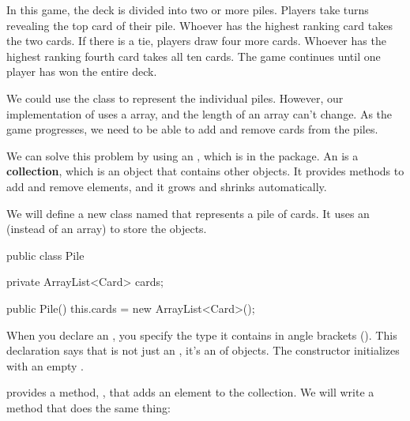 In this game, the deck is divided into two or more piles.
Players take turns revealing the top card of their pile.
Whoever has the highest ranking card takes the two cards.
If there is a tie, players draw four more cards.
Whoever has the highest ranking fourth card takes all ten cards.
The game continues until one player has won the entire deck.

We could use the  class to represent the individual piles.
However, our implementation of  uses a  array, and the length of an array can't change.
As the game progresses, we need to be able to add and remove cards from the piles.


We can solve this problem by using an , which is in the  package.
An  is a {\bf collection}, which is an object that contains other objects.
It provides methods to add and remove elements, and it grows and shrinks automatically.


We will define a new class named  that represents a pile of cards.
It uses an  (instead of an array) to store the  objects.

\begin{code}
public class Pile {
    private ArrayList<Card> cards;

    public Pile() {
        this.cards = new ArrayList<Card>();
    }
}
\end{code}


When you declare an , you specify the type it contains in angle brackets (\java{<>}).
This declaration says that  is not just an , it's an  of  objects.
The constructor initializes  with an empty .


 provides a method, , that adds an element to the collection.
We will write a  method that does the same thing:

